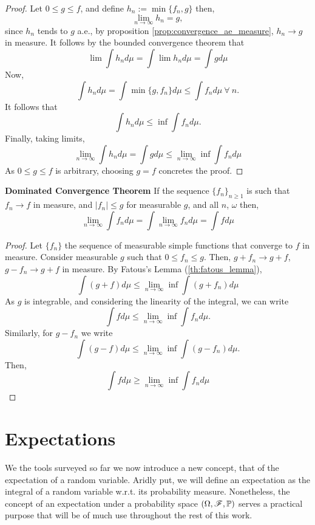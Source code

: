 \documentclass[../TGMAFFIRO.tex]{subfiles}
\begin{document}
\begin{proof}
	Let $0 \leq g \leq f$, and define $h_n:= \min\{f_n, g\}$ then,
	\[
		\lim_{n\to\infty} h_n = g,
	\]
	since $h_n$ tends to $g$ a.e., by proposition \ref{prop:convergence_ae_measure}, $h_n \to g$ in measure. It follows by the bounded convergence theorem that
	\begin{equation}
		\lim \int h_n d\mu = \int \lim h_n d\mu = \int g d\mu
	\end{equation}
	Now, 
	\[
		\int h_n d\mu = \int \min\{g, f_n\} d\mu \leq \int f_n d	\mu \ \forall \ n.
	\]
	It follows that
	\[
		\int h_n d\mu \leq \inf\int f_n d\mu.
	\]
	Finally, taking limits,
	\[
		\lim_{n\to\infty} \int h_n d\mu = \int g d\mu \leq \lim_{n\to\infty}\inf \int f_n d\mu
	\]
	As $0 \leq g \leq f$ is arbitrary, choosing $g = f$ concretes the proof.
\end{proof}

\begin{theorem} \textbf{Dominated Convergence Theorem}
If the sequence $\{f_n\}_{n\geq 1}$ is such that $f_n \to f$ in measure, and $|f_n| \leq g$ for measurable $g$, and all $n$, $\omega$ then,
\begin{equation}
	\lim_{n\to\infty}\int f_n d\mu = \int \lim_{n\to\infty} f_n d\mu  = \int f d\mu
\end{equation}
\end{theorem}

\begin{proof}
	Let $\{f_n\}$ the sequence of measurable simple functions that converge to $f$ in measure. Consider measurable $g$ such that $0 \leq f_n \leq g$. Then, $g + f_n \to g + f$, $g - f_n \to g + f$ in measure. By Fatous's Lemma (\ref	{th:fatous_lemma}),
	\[
		\int(g + f) d\mu \leq \lim_{n\to\infty}\inf\int(g + f_n) d\mu
	\]	
	As $g$ is integrable, and considering the linearity of the integral, we can write
	\[
		\int f d\mu \leq \lim_{n\to\infty}\inf\int f_n d\mu.
	\]
	Similarly, for $g - f_n$ we write
	\[
		\int(g - f) d\mu \leq \lim_{n\to\infty} \inf \int (g - f_n) d\mu.
	\]
	Then,
	\[
		\int f d\mu \geq \lim_{n\to\infty} \inf \int f_n d\mu
	\]
\end{proof}

\section{Expectations}
We the tools surveyed so far we now introduce a new concept, that of the expectation of a random variable. Aridly put, we will define an expectation as the integral of a random variable w.r.t. its probability measure. Nonetheless, the concept of an expectation under a probability space $(\Omega, \mathscr{F}, \mathbb{P})$ serves a practical purpose that will be of much use throughout the rest of this work.
\end{document}
